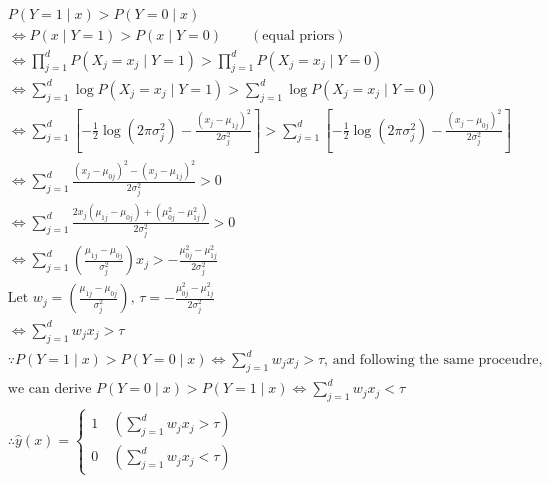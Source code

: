 \documentclass{article}
\theoremstyle{definition}
\theoremstyle{remark}
\begin{document}
\begin{enumerate}[font={\Large\bfseries},left=0pt]
\begin{tcolorbox}
		\begin{align}
			 & P(Y=1 \mid x) > P(Y=0 \mid x)                                                                                                            \\
			 & \iff P(x \mid Y=1) > P(x \mid Y=0) \qquad (\text{equal priors})                                                                          \\
			 & \iff \prod_{j=1}^d P(X_j=x_j \mid Y=1) > \prod_{j=1}^d P(X_j=x_j \mid Y=0)                                                               \\
			 & \iff \sum_{j=1}^d \log P(X_j=x_j \mid Y=1) > \sum_{j=1}^d \log P(X_j=x_j \mid Y=0)                                                       \\
			 & \iff \sum_{j=1}^d \left[
				-\tfrac12 \log(2\pi\sigma_j^2) - \frac{(x_j-\mu_{1j})^2}{2\sigma_j^2}
				\right]
			>
			\sum_{j=1}^d \left[
				-\tfrac12 \log(2\pi\sigma_j^2) - \frac{(x_j-\mu_{0j})^2}{2\sigma_j^2}
			\right]                                                                                                                                     \\
			 & \iff \sum_{j=1}^d \frac{(x_j-\mu_{0j})^2 - (x_j-\mu_{1j})^2}{2\sigma_j^2} > 0                                                            \\
			 & \iff \sum_{j=1}^d \frac{2x_j(\mu_{1j}-\mu_{0j}) + (\mu_{0j}^2-\mu_{1j}^2)}{2\sigma_j^2} > 0                                              \\
			 & \iff \sum_{j=1}^d \left(\frac{\mu_{1j}-\mu_{0j}}{\sigma_j^2}\right) x_j > - \frac{\mu_{0j}^2 - \mu_{1j}^2}{2\sigma^2_j}                  \\
			 & \text{Let } w_j = \left(\frac{\mu_{1j}-\mu_{0j}}{\sigma_j^2}\right)\text{, } \tau =- \frac{\mu_{0j}^2 - \mu_{1j}^2}{2\sigma^2_j}         \\
			 & \iff \sum^{d}_{j = 1} w_j x_j > \tau                                                                                                     \\
			 & \because P(Y = 1 \mid x) > P(Y = 0 \mid x) \iff \sum^{d}_{j = 1} w_j x_j > \tau\text{, and following the same proceudre, }               \\
			 & \text{we can derive }P(Y = 0 \mid x)> P(Y = 1 \mid x) \iff \sum^{d}_{j = 1} w_j x_j < \tau                                               \\
			 & \therefore \hat{y}(x) = \begin{cases} 1 \quad (\sum^{d}_{j = 1} w_j x_j > \tau) \\ 0 \quad (\sum^{d}_{j = 1} w_j x_j < \tau) \end{cases}
		\end{align}


\end{tcolorbox}
\end{enumerate}
\end{document}
